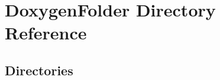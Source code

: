 \section{Doxygen\+Folder Directory Reference}
\label{dir_9b3cb8c3f666cc72d5e839902b2f2241}
\subsection*{Directories}
\begin{DoxyCompactItemize}
\end{DoxyCompactItemize}
